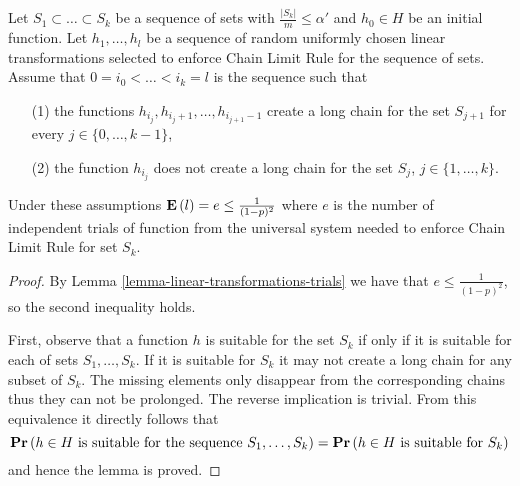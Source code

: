 \begin{lemma}
\label{lemma-sets}
Let $S_1 \subset \dots \subset S_k$ be a sequence of sets with $\frac{|S_k|}{m} \leq \alpha'$ and $h_0 \in H$ be an initial function. Let $h_1, \dots, h_l$ be a sequence of random uniformly chosen linear transformations selected to enforce Chain Limit Rule for the sequence of sets. Assume that $0 = i_0 < \dots < i_k = l$ is the sequence such that 
\begin{enumerate}
\item[(1)] the functions $h_{i_{j}}, h_{i_{j} + 1}, \dots, h_{i_{j + 1} - 1}$ create a long chain for the set $S_{j + 1}$ for every $j \in \{0, \dots, k - 1 \}$,
\item[(2)] the function $h_{i_{j}}$ does not create a long chain for the set $S_j$, $j \in \{1, \dots, k\}$.
\end{enumerate}
Under these assumptions $\mathbf{E}\left(l\right) = e \leq \frac{1}{(1 - p) ^ 2}$ where $e$ is the number of independent trials of function from the universal system needed to enforce Chain Limit Rule for set $S_k$.
\end{lemma}
\begin{proof}
By Lemma \ref{lemma-linear-transformations-trials} we have that $e \leq \frac{1}{(1 - p) ^ 2}$, so the second inequality holds.

First, observe that a function $h$ is suitable for the set $S_k$ if only if it is suitable for each of sets $S_1, \dots, S_k$. If it is suitable for $S_k$ it may not create a long chain for any subset of $S_k$. The missing elements only disappear from the corresponding chains thus they can not be prolonged. The reverse implication is trivial. From this equivalence it directly follows that $$\mathbf{Pr}\left(h \in H \text{ is suitable for the sequence } S_1, \dots, S_k\right) = \mathbf{Pr}\left(h \in H \text{ is suitable for } S_k\right)$$ and hence the lemma is proved.
\end{proof}

